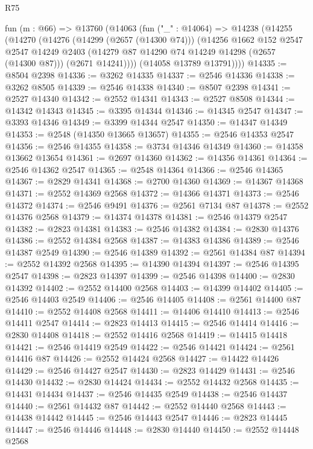 \begin{lexlean}{R75}
\begin{coremodule}
  fun (m : @66) =>
  @13760
    (@14063
      (fun ("_" : @14064) =>
      @14238
        (@14255
          (@14270
            (@14276
              (@14299 (@2657 (@14300 @74)))
              (@14256
                @1662
                @152
                @2547
                @2547
                @14249
                @2403
                (@14279 @87 @14290 @74 @14249 @14298 (@2657 (@14300 @87)))
                (@2671 @14241))))
          (@14058 @13789 @13791))))
@14335 := @8504 @2398
@14336 := @3262 @14335
@14337 := @2546 @14336
@14338 := @3262 @8505
@14339 := @2546 @14338
@14340 := @8507 @2398
@14341 := @2527 @14340
@14342 := @2552 @14341
@14343 := @2527 @8508
@14344 := @14342 @14343
@14345 := @3395 @14344
@14346 := @14345 @2547
@14347 := @3393 @14346
@14349 := @3399 @14344 @2547
@14350 := @14347 @14349
@14353 := @2548 (@14350 @13665 @13657)
@14355 := @2546 @14353 @2547
@14356 := @2546 @14355
@14358 := @3734 @14346 @14349
@14360 := @14358 @13662 @13654
@14361 := @2697 @14360
@14362 := @14356 @14361
@14364 := @2546 @14362 @2547
@14365 := @2548 @14364
@14366 := @2546 @14365
@14367 := @2829 @14341
@14368 := @2700 @14360
@14369 := @14367 @14368
@14371 := @2552 @14369 @2568
@14372 := @14366 @14371
@14373 := @2546 @14372
@14374 := @2546 @9491
@14376 := @2561 @7134 @87
@14378 := @2552 @14376 @2568
@14379 := @14374 @14378
@14381 := @2546 @14379 @2547
@14382 := @2823 @14381
@14383 := @2546 @14382
@14384 := @2830 @14376
@14386 := @2552 @14384 @2568
@14387 := @14383 @14386
@14389 := @2546 @14387 @2549
@14390 := @2546 @14389
@14392 := @2561 @14384 @87
@14394 := @2552 @14392 @2568
@14395 := @14390 @14394
@14397 := @2546 @14395 @2547
@14398 := @2823 @14397
@14399 := @2546 @14398
@14400 := @2830 @14392
@14402 := @2552 @14400 @2568
@14403 := @14399 @14402
@14405 := @2546 @14403 @2549
@14406 := @2546 @14405
@14408 := @2561 @14400 @87
@14410 := @2552 @14408 @2568
@14411 := @14406 @14410
@14413 := @2546 @14411 @2547
@14414 := @2823 @14413
@14415 := @2546 @14414
@14416 := @2830 @14408
@14418 := @2552 @14416 @2568
@14419 := @14415 @14418
@14421 := @2546 @14419 @2549
@14422 := @2546 @14421
@14424 := @2561 @14416 @87
@14426 := @2552 @14424 @2568
@14427 := @14422 @14426
@14429 := @2546 @14427 @2547
@14430 := @2823 @14429
@14431 := @2546 @14430
@14432 := @2830 @14424
@14434 := @2552 @14432 @2568
@14435 := @14431 @14434
@14437 := @2546 @14435 @2549
@14438 := @2546 @14437
@14440 := @2561 @14432 @87
@14442 := @2552 @14440 @2568
@14443 := @14438 @14442
@14445 := @2546 @14443 @2547
@14446 := @2823 @14445
@14447 := @2546 @14446
@14448 := @2830 @14440
@14450 := @2552 @14448 @2568

\end{coremodule}
\end{lexlean}
